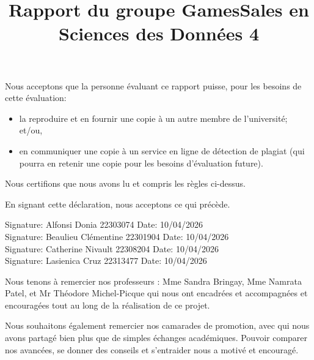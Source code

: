 \documentclass[mstat,12pt]{unswthesis}
\title{Rapport du groupe GamesSales en Sciences des Données 4  }
\author{\Authornameonly}
\begin{document}
\beforepreface
\afterpreface




\vskip 2pc  
\noindent Nous acceptons que la personne évaluant ce rapport puisse, pour les besoins de cette évaluation:
\begin{itemize}
\item la reproduire et en fournir une copie à un autre membre de l'université; et/ou,
\item en communiquer une copie à un service en ligne de détection de plagiat (qui pourra en retenir une copie pour les besoins d'évaluation future).
\end{itemize}

\vskip 2pc 
\noindent Nous certifions que nous avons lu et compris les règles ci-dessus.\vspace{24pt}

\vskip 2pc 
\noindent En signant cette déclaration, nous acceptons ce qui précède.

\vskip 2pc 
\noindent
\noindent
Signature: Alfonsi Donia 22303074 \hfill 
Date: 10/04/2026 \\[1cm]

Signature: Beaulieu Clémentine 22301904 \hfill 
Date: 10/04/2026 \\[1cm]

Signature: Catherine Nivault 22308204 \hfill 
Date: 10/04/2026 \\[1cm]

Signature: Lasienica Cruz 22313477 \hfill 
Date: 10/04/2026 \\[1cm]

\vskip 1pc





{\bigskip}
Nous tenons à remercier nos professeurs : Mme Sandra Bringay, Mme Namrata Patel, et Mr Théodore Michel-Picque qui nous ont encadrées et accompagnées et encouragées tout au long de la réalisation de ce projet. 

Nous souhaitons également remercier nos camarades de promotion, avec qui nous avons partagé bien plus que de simples échanges académiques. Pouvoir comparer nos avancées, se donner des conseils et s’entraider nous a motivé et encouragé.
{\bigskip\bigskip\bigskip\noindent} 
\end{document}
